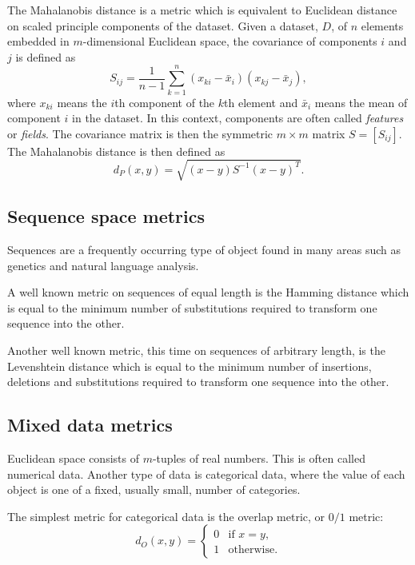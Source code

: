 \documentclass[a4paper]{report}
\newcommand{\dset}{D}
\begin{document}
The Mahalanobis distance \citep{mahalanobis30distance} is a metric which is
equivalent to Euclidean distance on scaled principle components of the
dataset.  Given a dataset, $\dset$, of $n$ elements embedded in
$m$-dimensional Euclidean space, the covariance of components $i$ and $j$ is
defined as
\begin{equation*}
  S_{ij} = \frac{1}{n-1} \sum_{k=1}^{n} (x_{ki}-\bar{x}_i)(x_{kj}-\bar{x}_j),
\end{equation*}
where $x_{ki}$ means the $i$th component of the $k$th element and $\bar{x}_i$
means the mean of component $i$ in the dataset.  In this context, components
are often called \textit{features} or \textit{fields}.  The covariance matrix
is then the symmetric $m \times m$ matrix $S = [S_{ij}]$.  The Mahalanobis
distance is then defined as
\begin{equation*}
  d_{P}(x,y) = \sqrt{(x-y)S^{-1}(x-y)^T}.
\end{equation*}

\subsection{Sequence space metrics}
\label{sec:sequ-space-metr}

Sequences are a frequently occurring type of object found in many areas such
as genetics and natural language analysis.

A well known metric on sequences of equal length is the Hamming distance
\citep{hamming50errorcodes} which is equal to the minimum number of
substitutions required to transform one sequence into the other.

Another well known metric, this time on sequences of arbitrary length, is the
Levenshtein distance \citep{levenshtein1965distance} which is equal to the
minimum number of insertions, deletions and substitutions required to
transform one sequence into the other.

\subsection{Mixed data metrics}
\label{sec:mixed-data-metrics}

Euclidean space consists of $m$-tuples of real numbers.  This is often called
numerical data.  Another type of data is categorical data, where the value of
each object is one of a fixed, usually small, number of categories.

The simplest metric for categorical data is the overlap metric, or $0/1$
metric:
\begin{equation*}
  d_O(x,y) =
  \begin{cases}
    0 & \text{if $x=y$,} \\
    1 & \text{otherwise.}
  \end{cases}
\end{equation*}
\end{document}
